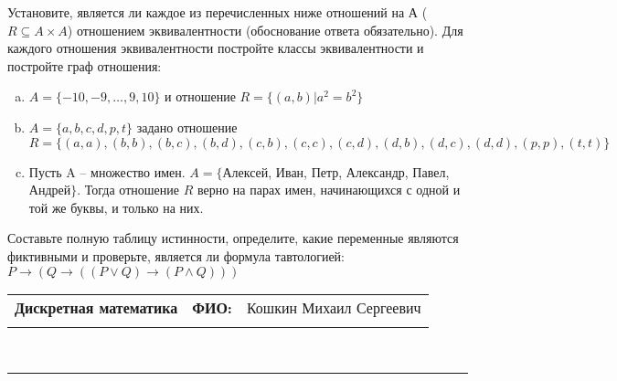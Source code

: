 \documentclass[10pt]{exam}
\newcommand{\class}{Дискретная математика}
\newcommand{\examdate}{}
\begin{document}
\begin{questions}
\question
Установите, является ли каждое из перечисленных ниже отношений на А ($R \subseteq A \times A$) отношением эквивалентности (обоснование ответа обязательно). Для каждого отношения эквивалентности постройте классы 
эквивалентности и постройте граф отношения:
\begin{enumerate} [a)]\setcounter{enumi}{0}
\item $A = \{-10, -9, … , 9, 10\}$ и отношение $R = \{(a,b)|a^{2} = b^{2}\}$
\item $A = \{a, b, c, d, p, t\}$ задано отношение $R = \{(a, a), (b, b), (b, c), (b, d), (c, b), (c, c), (c, d), (d, b), (d, c), (d, d), (p,p), (t,t)\}$
\item Пусть A – множество имен. $A = \{ $Алексей, Иван, Петр, Александр, Павел, Андрей$ \}$. Тогда отношение $R$ верно на парах имен, начинающихся с одной и той же буквы, и только на них.
\end{enumerate}\question Составьте полную таблицу истинности, определите, какие переменные являются фиктивными и проверьте, является ли формула тавтологией:
$ P \rightarrow (Q \rightarrow ((P \lor Q) \rightarrow (P \land Q)))$

\end{questions}
\newpage
\begin{flushright}
\begin{tabular}{p{2.8in} r l}
\textbf{\class} & \textbf{ФИО:} &Кошкин Михаил Сергеевич
\\

\textbf{\examdate} &&\\
\end{tabular}\\
\end{flushright}
\rule[1ex]{\textwidth}{.1pt}
\end{document}
